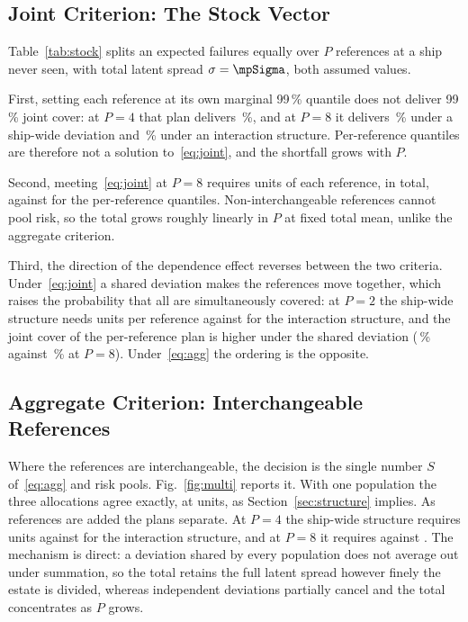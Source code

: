 \subsection{Joint Criterion: The Stock Vector}
Table~\ref{tab:stock} splits an expected \mpMean{} failures equally over $P$
references at a ship never seen, with total latent spread $\sigma=\mpSigma$, both
assumed values.

First, setting each reference at its own marginal 99\,\% quantile does not deliver
99\,\% joint cover: at $P=4$ that plan delivers \svNaiveShipFour\,\%, and at
$P=8$ it delivers \svNaiveShip\,\% under a ship-wide deviation and
\svNaiveInter\,\% under an interaction structure. Per-reference quantiles are
therefore not a solution to~\eqref{eq:joint}, and the shortfall grows with $P$.

Second, meeting~\eqref{eq:joint} at $P=8$ requires \svJointEight{} units of each
reference, \svJointTotEight{} in total, against \svMargTotEight{} for the
per-reference quantiles. Non-interchangeable references cannot pool risk, so the
total grows roughly linearly in $P$ at fixed total mean, unlike the aggregate
criterion.

Third, the direction of the dependence effect reverses between the two criteria.
Under~\eqref{eq:joint} a shared deviation makes the references move together,
which raises the probability that all are simultaneously covered: at $P=2$ the
ship-wide structure needs \svJointShipTwo{} units per reference against
\svJointInterTwo{} for the interaction structure, and the joint cover of the
per-reference plan is higher under the shared deviation (\svNaiveShip\,\% against
\svNaiveInter\,\% at $P=8$). Under~\eqref{eq:agg} the ordering is the opposite.

\subsection{Aggregate Criterion: Interchangeable References}
Where the references are interchangeable, the decision is the single number $S$
of~\eqref{eq:agg} and risk pools. Fig.~\ref{fig:multi} reports it. With one population the three
allocations agree exactly, at \mpShipOne{} units, as Section~\ref{sec:structure}
implies. As references are added the plans separate.
At $P=4$ the ship-wide structure requires \mpShipFour{} units against
\mpInterFour{} for the interaction structure, and at $P=8$ it requires
\mpShipEight{} against \mpInterEight{}. The mechanism is direct: a deviation
shared by every population does not average out under summation, so the total
retains the full latent spread however finely the estate is divided, whereas
independent deviations partially cancel and the total concentrates as $P$ grows.

